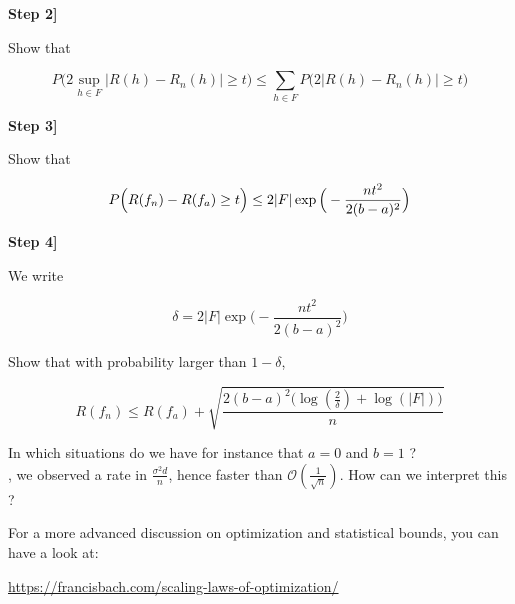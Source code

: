 \documentclass[
10pt, %
a4paper, %
oneside, %
headinclude,footinclude, %
BCOR5mm, %
]{scrartcl}
\begin{document}
\textbf{Step 2]}

Show that

    
    \begin{equation}
	P\Big(2 \sup_{h\in F}|R(h)-R_n(h)|\geq t\Big) \leq \sum_{h\in F} P\big( 2 |R(h)-R_n(h)|\geq t\big)
    \end{equation}

\textbf{Step 3]}

Show that

\begin{equation}
	P\Big(  R( f_n)-R(f_a)\geq t\Big) \leq 2|F|\exp\Big( -\frac{nt^2}{2(b-a)^2} \Big)\\
\end{equation}

\textbf{Step 4]}

We write

\begin{equation}
    \delta = 2|F|\exp\Big( -\frac{nt^2}{2(b-a)^2} \Big)
\end{equation}

Show that with probability larger than $ 1-\delta$,

\begin{equation}
    R(f_n)\leq R(f_a)+\sqrt{\frac{2(b-a)^2\Big(\log(\frac{2}{\delta})+\log(|F|)\Big)}{n}}
\end{equation}

In which situations do we have for instance that $a=0$ and $b=1$ ?
\\

{, we observed a rate in $ \frac{\sigma^2d}{n}$, hence faster than $\mathcal{O}(\frac{1}{\sqrt{n}})$. How can we interpret this ?}

For a more advanced discussion on optimization and statistical bounds, you can have a look at:

\url{https://francisbach.com/scaling-laws-of-optimization/} 
        
\end{document}
